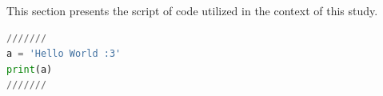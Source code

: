 This section presents the script of code utilized in the context of this study.

\begin{lstlisting}[language=Python, label={lst:code_all}]
///////
a = 'Hello World :3'
print(a)
///////
\end{lstlisting}